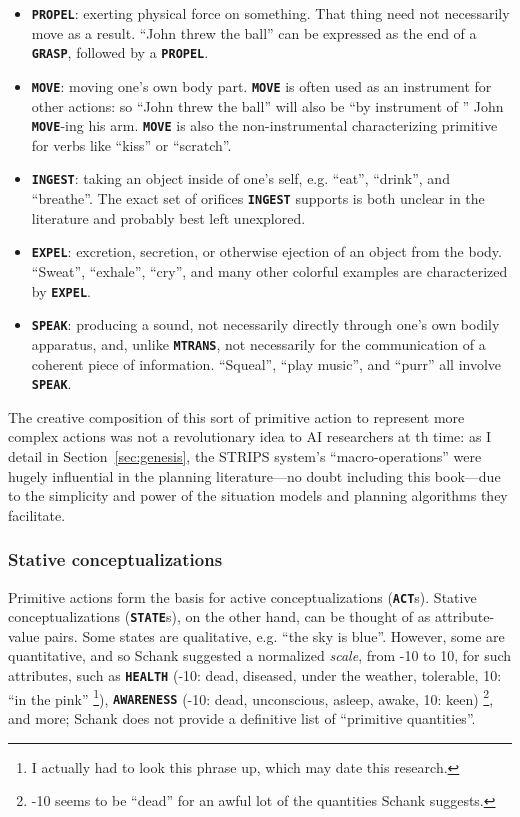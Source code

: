 \begin{itemize}
    \item \texttt{\textbf{PROPEL}}: exerting physical force on something. That thing need not necessarily move as a result. ``John threw the ball'' can be expressed as the end of a \texttt{\textbf{GRASP}}, followed by a \texttt{\textbf{PROPEL}}.
    
    \item \texttt{\textbf{MOVE}}: moving one's own body part. \texttt{\textbf{MOVE}} is often used as an instrument for other actions: so ``John threw the ball'' will also be ``by instrument of '' John \texttt{\textbf{MOVE}}-ing his arm. \texttt{\textbf{MOVE}} is also the non-instrumental characterizing primitive for verbs like ``kiss'' or ``scratch''.
    
    \item \texttt{\textbf{INGEST}}: taking an object inside of one's self, e.g. ``eat'', ``drink'', and ``breathe''. The exact set of orifices \texttt{\textbf{INGEST}} supports is both unclear in the literature and probably best left unexplored.
    
    \item \texttt{\textbf{EXPEL}}: excretion, secretion, or otherwise ejection of an object from the body. ``Sweat'', ``exhale'', ``cry'', and many other colorful examples are characterized by \texttt{\textbf{EXPEL}}.
    
    \item \texttt{\textbf{SPEAK}}: producing a sound, not necessarily directly through one's own bodily apparatus, and, unlike \texttt{\textbf{MTRANS}}, not necessarily for the communication of a coherent piece of information. ``Squeal'', ``play music'', and ``purr'' all involve \texttt{\textbf{SPEAK}}.
\end{itemize}

The creative composition of this sort of primitive action to represent more complex actions was not a revolutionary idea to AI researchers at th time: as I detail in Section~\ref{sec:genesis}, the STRIPS system's \citep{fikes1972} ``macro-operations'' were hugely influential in the planning literature---no doubt including this book---due to the simplicity and power of the situation models and planning algorithms they facilitate.

\subsubsection{Stative conceptualizations}
Primitive actions form the basis for active conceptualizations (\texttt{\textbf{ACT}}s). Stative conceptualizations (\texttt{\textbf{STATE}}s), on the other hand, can be thought of as attribute-value pairs. Some states are qualitative, e.g. ``the sky is blue''. However, some are quantitative, and so Schank suggested a normalized \textit{scale}, from -10 to 10, for such attributes, such as \texttt{\textbf{HEALTH}} (-10: dead, diseased, under the weather, tolerable, 10: ``in the pink'' \footnote{I actually had to look this phrase up, which may date this research.}), \texttt{\textbf{AWARENESS}} (-10: dead, unconscious, asleep, awake, 10: keen) \footnote{-10 seems to be ``dead'' for an awful lot of the quantities Schank suggests.}, and more; Schank does not provide a definitive list of ``primitive quantities''.

